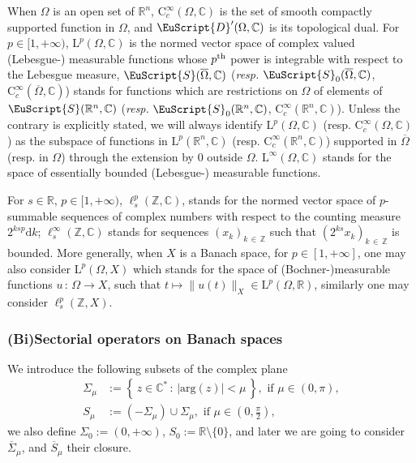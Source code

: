 \documentclass[10pt]{amsart}
\theoremstyle{definition}\newtheorem{defi}[theo]{Definition}\newtheorem{rema}[theo]{Remark}\newtheorem{exam}[theo]{Example}\newtheorem{exem}[theo]{Example}\newtheorem{nota}[theo]{Notation}
\newcommand{\bbR}{\mathbb{R}}
\newcommand{\bbC}{\mathbb{C}}
\newcommand{\bbZ}{\mathbb{Z}}
\newcommand{\rmd}{\mathrm{d}}
\newcommand{\rmL}{\mathrm{L}}
\newcommand{\rmC}{\mathrm{C}}
\newcommand{\argg}{\mathrm{arg}}
\newcommand{\eus}{\EuScript}
\begin{document}
When $\Omega$ is an open set of $\bbR^n$, $\rmC_c^\infty(\Omega,\bbC)$ is the set of smooth compactly supported function in $\Omega$, and
$\eus{D}'(\Omega,\bbC)$ is its topological dual. For $p\in[1,+\infty)$, $\rmL^p(\Omega,\bbC)$ is the normed vector space of complex valued (Lebesgue-) measurable functions whose $p^{\rm th}$ power is integrable with respect to the Lebesgue measure, $\eus{S}(\overline{\Omega},\bbC)$ (\emph{resp.} $\eus{S}_0(\overline{\Omega},\bbC)$, $\rmC_c^\infty(\overline{\Omega},\bbC)$) stands for functions which are restrictions on $\Omega$ of elements of $\eus{S}(\bbR^n,\bbC)$ (\emph{resp.} $\eus{S}_0(\bbR^n,\bbC)$, $\rmC_c^\infty(\bbR^n,\bbC)$). Unless the contrary is explicitly stated, we will always identify $\rmL^p(\Omega,\bbC)$ (resp. $\rmC_c^\infty(\Omega,\bbC)$) as the subspace of functions in $\rmL^p(\bbR^n,\bbC)$ (resp. $\rmC_c^\infty(\bbR^n,\bbC)$) supported in $\overline{\Omega}$ (resp. in $\Omega$) through the extension by $0$ outside $\Omega$. $\rmL^\infty(\Omega,\bbC)$ stands for the space of essentially bounded (Lebesgue-) measurable functions.

For $s\in\bbR$, $p\in[1,+\infty)$,
$\ell^p_s(\bbZ,\bbC)$, stands for the normed vector space of $p$-summable sequences of complex numbers with respect to the counting measure $2^{ksp}\rmd k$; $\ell^\infty_s(\bbZ,\bbC)$ stands for sequences $(x_k)_{k\,\in\,\bbZ}$ such that $(2^{ks}x_k)_{k\,\in\,\bbZ}$ is bounded. More generally, when $X$ is a Banach space, for $p\in[1,+\infty]$, one may also consider $\rmL^p(\Omega,X)$ which stands for the space of (Bochner-)measurable functions $u\,:\,\Omega\longrightarrow X$, such that $t\mapsto\| u(t)\|_X \in \rmL^p(\Omega,\bbR)$, similarly one may consider $\ell^p_s(\bbZ,X)$.

\subsubsection{(Bi)Sectorial operators on Banach spaces}

We introduce the following subsets of the complex plane
\begin{align*}
\Sigma_\mu &:= \left\{ \,z\in\bbC^\ast\,:\,|\argg(z)|<\mu\,\right\}, \text{ if } \mu\in(0,\pi),\\
S_\mu &:= \left(-\Sigma_\mu\right)\cup \Sigma_\mu, \text{ if } \mu\in\left(0,\frac{\pi}{2}\right),
\end{align*}
we also define $\Sigma_0:= (0,+\infty)$, $S_0:= \bbR\setminus\{0\}$, and later we are going to consider $\overline{\Sigma}_\mu$, and $\overline{S}_\mu$ their closure.
\end{document}
